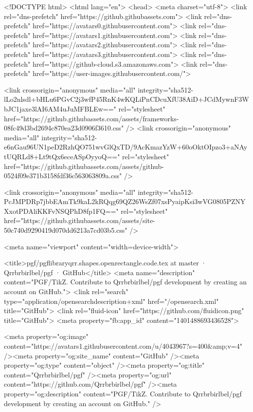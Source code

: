 





<!DOCTYPE html>
<html lang="en">
  <head>
    <meta charset="utf-8">
  <link rel="dns-prefetch" href="https://github.githubassets.com">
  <link rel="dns-prefetch" href="https://avatars0.githubusercontent.com">
  <link rel="dns-prefetch" href="https://avatars1.githubusercontent.com">
  <link rel="dns-prefetch" href="https://avatars2.githubusercontent.com">
  <link rel="dns-prefetch" href="https://avatars3.githubusercontent.com">
  <link rel="dns-prefetch" href="https://github-cloud.s3.amazonaws.com">
  <link rel="dns-prefetch" href="https://user-images.githubusercontent.com/">



  <link crossorigin="anonymous" media="all" integrity="sha512-lLo2nlsdl+bHLu6PGvC2j3wfP45RnK4wKQLiPnCDcuXfU38AiD+JCdMywnF3WbJC1jaxe3lAI6AM4uJuMFBLEw==" rel="stylesheet" href="https://github.githubassets.com/assets/frameworks-08fc49d3bd2694c870ea23d0906f3610.css" />
  <link crossorigin="anonymous" media="all" integrity="sha512-e6nGau96UN1peD2RzhQO751wvGlQxTD/9AcKmazYzW+60oOktOIpzo3+aNAytUQRLd8+Lt9tQx6eceASpOyyoQ==" rel="stylesheet" href="https://github.githubassets.com/assets/github-0524f09e371b3158fdf36c563063809a.css" />
  
  
  <link crossorigin="anonymous" media="all" integrity="sha512-PcJMPDRp7jbbEAmTk9kaL2kRQqg69QZ26WsZf07xsPyaipKsi3wVG0805PZNYXxotPDAliKKFvNSQPhD8fp1FQ==" rel="stylesheet" href="https://github.githubassets.com/assets/site-50c740d9290419d070dd6213a7cd03b5.css" />
  
  

  <meta name="viewport" content="width=device-width">
  
  <title>pgf/pgflibraryqrr.shapes.openrectangle.code.tex at master · Qrrbrbirlbel/pgf · GitHub</title>
    <meta name="description" content="PGF/TikZ. Contribute to Qrrbrbirlbel/pgf development by creating an account on GitHub.">
    <link rel="search" type="application/opensearchdescription+xml" href="/opensearch.xml" title="GitHub">
  <link rel="fluid-icon" href="https://github.com/fluidicon.png" title="GitHub">
  <meta property="fb:app_id" content="1401488693436528">

    
    <meta property="og:image" content="https://avatars1.githubusercontent.com/u/4043967?s=400&amp;v=4" /><meta property="og:site_name" content="GitHub" /><meta property="og:type" content="object" /><meta property="og:title" content="Qrrbrbirlbel/pgf" /><meta property="og:url" content="https://github.com/Qrrbrbirlbel/pgf" /><meta property="og:description" content="PGF/TikZ. Contribute to Qrrbrbirlbel/pgf development by creating an account on GitHub." />

